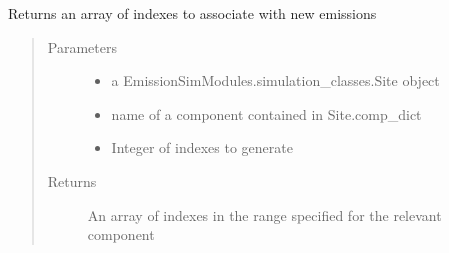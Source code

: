 \documentclass[letterpaper,10pt,english]{sphinxmanual}
\begin{document}

\begin{fulllineitems}
\label{\detokenize{index:feast.EmissionSimModules.emission_class_functions.comp_indexes_fcn}}
Returns an array of indexes to associate with new emissions
\begin{quote}\begin{description}
\item[{Parameters}] \leavevmode\begin{itemize}
\item {} 
 \textendash{} a EmissionSimModules.simulation\_classes.Site object

\item {} 
 \textendash{} name of a component contained in Site.comp\_dict

\item {} 
 \textendash{} Integer of indexes to generate

\end{itemize}

\item[{Returns}] \leavevmode
An array of indexes in the range specified for the relevant component

\end{description}\end{quote}

\end{fulllineitems}

\end{document}
